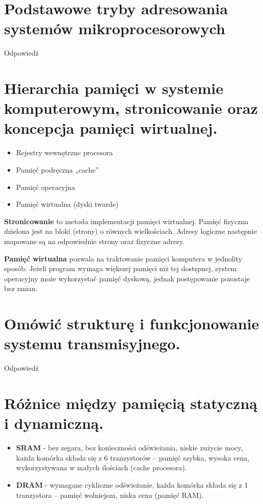 \documentclass[12pt,a4paper]{article}
\begin{document}
	\section{Podstawowe tryby adresowania systemów mikroprocesorowych}
	Odpowiedź

	\section{Hierarchia pamięci w systemie komputerowym, stronicowanie oraz koncepcja pamięci wirtualnej.}
	\begin{itemize}
		\item Rejestry wewnętrzne procesora
		\item Pamięć podręczna „cache”
		\item Pamięć operacyjna
		\item Pamięć wirtualna (dyski twarde)
	\end{itemize}

	\textbf{Stronicowanie} to metoda implementacji pamięci wirtualnej. Pamięć fizyczna dzielona jest na bloki (strony) o równych wielkościach. Adresy logiczne następnie mapowane są na odpowiednie strony oraz fizyczne adresy.
	
	\textbf{Pamięć wirtualna} pozwala na traktowanie pamięci komputera w jednolity sposób. Jeżeli program wymaga większej pamięci niż tej dostępnej, system operacyjny może wykorzystać pamięć dyskową, jednak postępowanie pozostaje bez zmian.

	\section{Omówić strukturę i funkcjonowanie systemu transmisyjnego.}
	Odpowiedź

	\section{Różnice między pamięcią statyczną i dynamiczną.}
	\begin{itemize}
		\item \textbf{SRAM} - bez zegara, bez konieczności odświeżania, niskie zużycie mocy, każda komórka składa się z 6 tranzystorów -- pamięć szybka, wysoka cena, wykorzystywana w małych ilościach (cache procesora). 
		\item \textbf{DRAM} -  wymagane cykliczne odświeżanie, każda komórka składa się z 1 tranzystora -- pamięć wolniejsza, niska cena (pamięć RAM).
	\end{itemize}
\end{document}
